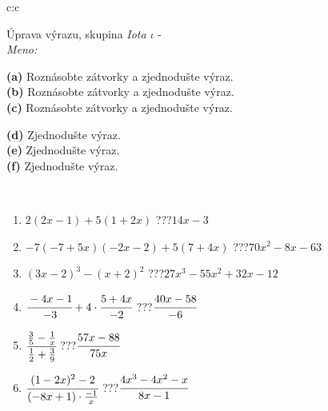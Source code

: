 \documentclass[10pt]{report}
\begin{document}
\newpage
\thispagestyle{empty}
\begin{tabular}{c:c}
\begin{minipage}[c][104.5mm][t]{0.5\linewidth}
\begin{center}
\vspace{7mm}
{\huge Úprava výrazu, skupina \textit{Iota $\iota$} -}\\[5mm]
\textit{Meno:}\phantom{xxxxxxxxxxxxxxxxxxxxxxxxxxxxxxxxxxxxxxxxxxxxxxxxxxxxxxxxxxxxxxxxx}\\[5mm]
\begin{minipage}{0.95\linewidth}
\begin{center}
{\small \begin{minipage}{0.6\textwidth}
\textbf{(a)} Roznásobte zátvorky a zjednodušte výraz. \\[1mm]
\textbf{(b)} Roznásobte zátvorky a zjednodušte výraz. \\[1mm]
\textbf{(c)} Roznásobte zátvorky a zjednodušte výraz.
\end{minipage} \begin{minipage}{0.39\textwidth}
\textbf{(d)} Zjednodušte výraz. \\[1mm]
\textbf{(e)} Zjednodušte výraz. \\[1mm]
\textbf{(f)} Zjednodušte výraz.
\end{minipage}
}
\end{center}
\end{minipage}
\\[4mm]
\begin{minipage}{0.79\linewidth}
\begin{center}
\begin{varwidth}{\linewidth}
\begin{enumerate}
\normalsize
\item $2(2x-1)+5(1+2x)$\quad \dotfill\; ???\;\dotfill \quad $14x-3$
\item $-7(-7+5x)(-2x-2)+5(7+4x)$\quad \dotfill\; ???\;\dotfill \quad $70x^2-8x-63$
\item $(3x-2)^3-(x+2)^2$\quad \dotfill\; ???\;\dotfill \quad $27x^3-55x^2+32x-12$
\item $\cfrac{-4x-1}{-3}+4\cdot\cfrac{5+4x}{-2}$\quad \dotfill\; ???\;\dotfill \quad $\cfrac{40x-58}{-6}$
\item $\cfrac{\frac{3}{5}-\frac{1}{x}}{\frac{1}{2}+\frac{3}{9}}$\quad \dotfill\; ???\;\dotfill \quad $\cfrac{57x-88}{75x}$
\item $\cfrac{(1-2x)^2-2}{(-8x+1)\cdot\frac{-1}{x}}$\quad \dotfill\; ???\;\dotfill \quad $\cfrac{4x^3-4x^2-x}{8x-1}$

\end{enumerate}
\end{varwidth}
\end{center}
\end{minipage}
\end{center}
\end{minipage}
\end{tabular}
\end{document}
